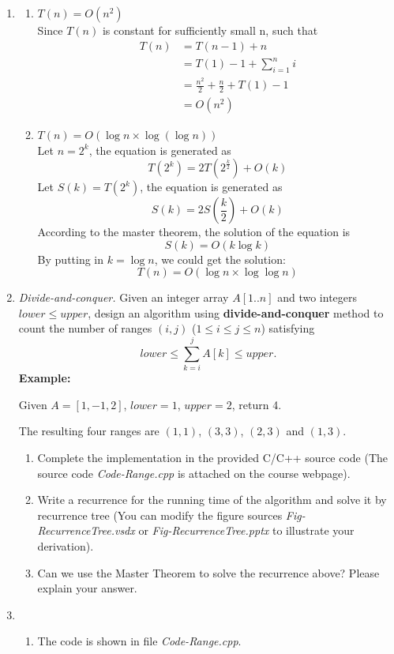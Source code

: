 \documentclass[12pt,a4paper]{article}
\makeatletter
\newtheorem*{solution}{Solution}
\theoremstyle{definition}
\renewenvironment{solution}[1][Solution] {\par\pushQED{\qed}\normalfont\topsep6\p@\@plus6\p@\relax\trivlist\item[\hskip\labelsep\bfseries#1\@addpunct{.}]\ignorespaces}{\popQED\endtrivlist\@endpefalse} \makeatother
\makeatother
\begin{document}
\begin{enumerate}
\begin{solution}
\begin{enumerate}
\item \emph{$T(n)=O(n^2)$}\\
Since $T(n)$ is constant for sufficiently small n, such that 
\begin{equation}
\begin{split}
T(n) &=T(n-1)+n\\
&= T(1)-1+\sum_{i=1}^n i \\
&= \frac{n^2}{2}+\frac{n}{2}+T(1)-1\\
&= O(n^2)
\end{split}
\end{equation}

\item \emph{$T(n)=O(\log n\times \log(\log n))$}\\
Let $n=2^k$, the equation is generated as
$$T(2^k)=2T(2^{\frac{k}{2}})+O(k)$$
Let $S(k)=T(2^k)$, the equation is generated as
$$S(k)=2S(\frac{k}{2})+O(k)$$
According to the master theorem, the solution of the equation is $$S(k)=O(k\log k)$$
By putting in $k=\log n$, we could get the solution:$$T(n)=O(\log n\times\log \log n)$$
\end{enumerate}
\end{solution}
\item
\textit{Divide-and-conquer.} Given an integer array $A[1..n]$ and two integers $lower \le upper$, design an algorithm using \textbf{divide-and-conquer} method to count the number of ranges $(i,j)$ ($1 \leq i \leq j \leq n$) satisfying
$$
    lower \leq \sum_{k=i}^{j}{A[k]} \leq upper.
$$
\textbf{Example:}

Given $A = [1,-1,2]$, $lower = 1$, $upper = 2$, return 4.

The resulting four ranges are $(1,1)$, $(3,3)$, $(2,3)$ and $(1,3)$.

\begin{enumerate}
\item
Complete the implementation in the provided C/C++ source code {\color{blue}(The source code \emph{Code-Range.cpp} is attached on the course webpage)}.
\item
Write a recurrence for the running time of the algorithm and solve it by recurrence tree {\color{blue}(You can modify the figure sources \emph{Fig-RecurrenceTree.vsdx} or \emph{Fig-RecurrenceTree.pptx} to illustrate your derivation)}.
\item
Can we use the Master Theorem to solve the recurrence above? Please explain your answer.
\end{enumerate}
\begin{solution}
~\\
\begin{enumerate}
\item The code is shown in file \textit{Code-Range.cpp}.  


\end{enumerate}
\end{solution}
\end{enumerate}
\end{document}
